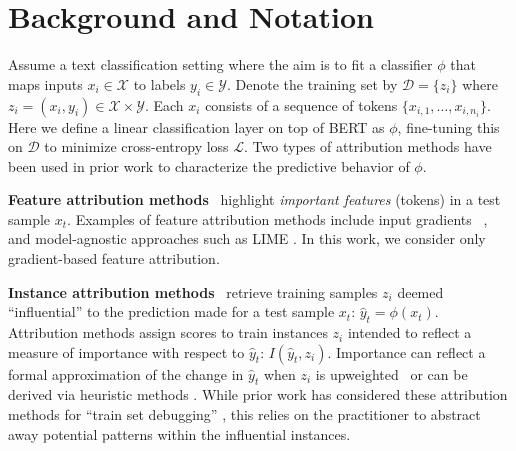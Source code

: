 \documentclass[11pt]{article}
\newcommand\para[1]{\vskip 1mm\noindent\textbf{#1}~}
\begin{document}
\section{Background and Notation}
Assume a text classification setting where the aim is to fit a classifier $\phi$ that maps inputs $x_i \in \mathcal{X}$ to labels $y_i \in \mathcal{Y}$.
Denote the training set by $\mathcal{D} = \{ z_i \}$ where $z_i = (x_i, y_i) \in \mathcal{X} \times \mathcal{Y}$. 
Each $x_i$ consists of a sequence of tokens $\{x_{i,1}, \dots, x_{i, n_i}\}$.
Here we define a linear classification layer on top of BERT \citep{devlin2019bert} as $\phi$, fine-tuning this on $\mathcal{D}$ to minimize cross-entropy loss $\mathcal{L}$.
Two types of attribution methods have been used in prior work to characterize the predictive behavior of $\phi$.

\para{Feature attribution methods} %
highlight \emph{important features} (tokens) in a test sample $x_t$. %
Examples of feature attribution methods include input gradients  ~\citep{sundararajan2017axiomatic, ancona2017towards}, and model-agnostic approaches such as LIME \citep{ribeiro2016should}. 
In this work, we consider only gradient-based feature attribution.  

\para{Instance attribution methods} retrieve training samples $z_i$ deemed ``influential'' to the prediction made for a test sample $x_t$: $\hat{y}_t = \phi(x_t)$. 
Attribution methods assign scores to train instances $z_i$ intended to reflect a measure of importance with respect to $\hat{y}_t$: $I(\hat{y}_t, z_i)$.
Importance can reflect a formal approximation of the change in $\hat{y}_t$ when $z_i$ is upweighted~\cite{koh2017understanding} or can be derived via heuristic methods \cite{pezeshkpour2021empirical,rajani2020explaining}. 
%
While prior work has considered these attribution methods for ``train set debugging'' \cite{koh2017understanding,han2020explaining}, this relies on the practitioner to abstract away potential patterns within the influential instances.
\end{document}
